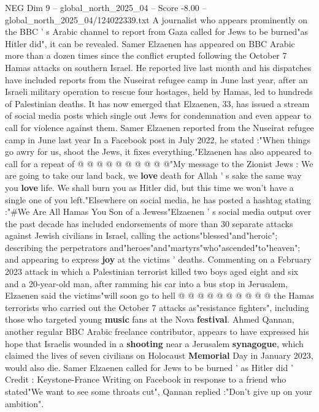 \begin{textsample}{NEG Dim 9 – global\_north\_2025\_04 – Score -8.00 – global\_north\_2025\_04/124022339.txt}  \label{ex:f9_neg_123}
A journalist who appears prominently on the BBC ' s Arabic channel to report from Gaza called for Jews to be burned"as Hitler did", it can be revealed.
Samer Elzaenen has appeared on BBC Arabic more than a dozen times since the conflict erupted following the October 7 Hamas attacks on southern Israel.
He reported live last month and his dispatches have included reports from the Nuseirat refugee camp in June last year, after an Israeli military operation to rescue four hostages, held by Hamas, led to hundreds of Palestinian deaths.
It has now emerged that Elzaenen, 33, has issued a stream of social media posts which single out Jews for condemnation and even appear to call for violence against them.
Samer Elzaenen reported from the Nuseirat refugee camp in June last year In a Facebook post in July 2022, he stated :"When things go awry for us, shoot the Jews, it fixes everything."Elzaenen has also appeared to call for a repeat of @ @ @ @ @ @ @ @ @ @"My message to the Zionist Jews : We are going to take our land back, we \textbf{love} death for Allah ' s sake the same way you \textbf{love} life.
We shall burn you as Hitler did, but this time we won't have a single one of you left."Elsewhere on social media, he has posted a hashtag stating :"\#We Are All Hamas You Son of a Jewess"Elzaenen ' s social media output over the past decade has included endorsements of more than 30 separate attacks against Jewish civilians in Israel, calling the actions"blessed"and"heroic"; describing the perpetrators and"heroes"and"martyrs"who"ascended"to"heaven"; and appearing to express \textbf{joy} at the victims ' deaths.
Commenting on a February 2023 attack in which a Palestinian terrorist killed two boys aged eight and six and a 20-year-old man, after ramming his car into a bus stop in Jerusalem, Elzaenen said the victims"will soon go to hell @ @ @ @ @ @ @ @ @ @ the Hamas terrorists who carried out the October 7 attacks as"resistance fighters", including those who targeted young \textbf{music} fans at the Nova \textbf{festival}.
Ahmed Qannan, another regular BBC Arabic freelance contributor, appears to have expressed his hope that Israelis wounded in a \textbf{shooting} near a Jerusalem \textbf{synagogue}, which claimed the lives of seven civilians on Holocaust \textbf{Memorial} Day in January 2023, would also die.
Samer Elzaenen called for Jews to be burned ' as Hitler did ' Credit : Keystone-France Writing on Facebook in response to a friend who stated"We want to see some throats cut", Qannan replied :"Don't give up on your ambition".

\end{textsample}
